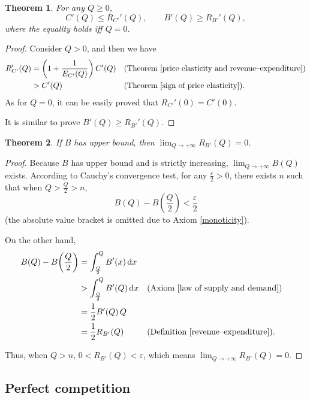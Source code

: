 \documentclass{article}
\newtheorem{theorem}{Theorem}[subsection]
\begin{document}
\begin{theorem}
\label{inequality of revenue--expenditure and supply and demand}
For any $Q\ge0$,
$$C'\!\left(Q\right)\le R_{C'}'\!\left(Q\right),
\qquad B'\!\left(Q\right)\ge R_{B'}'\!\left(Q\right),$$
where the equality holds iff $Q=0$.
\end{theorem}
\begin{proof}
Consider $Q>0$, and then we have
\begin{align*}
R_{C'}'\!\left(Q\right)&=\left(1+\frac1{E_{C'}\!\left(Q\right)}\right)C'\!\left(Q\right)&&\text{(Theorem \ref{price elasticity and revenue--expenditure})}\\
&>C'\!\left(Q\right)&&\text{(Theorem \ref{sign of price elasticity})}.
\end{align*}
As for $Q=0$, it can be easily proved that $R_{C'}'\!\left(0\right)=C'\!\left(0\right)$.

It is similar to prove $B'\!\left(Q\right)\ge R_{B'}'\!\left(Q\right)$.
\end{proof}

\begin{theorem}
\label{expenditure approaches 0}
If $B$ has upper bound, then $\lim_{Q\to+\infty}R_{B'}\!\left(Q\right)=0$.
\end{theorem}
\begin{proof}
Because $B$ has upper bound and is strictly increasing, $\lim_{Q\to+\infty}B\!\left(Q\right)$ exists.
According to Cauchy's convergence test, for any $\frac\varepsilon2>0$, there exists $n$ such that
when $Q>\frac Q2>n$,
$$B\!\left(Q\right)-B\!\left(\frac Q2\right)<\frac\varepsilon2$$
(the absolute value bracket is omitted due to Axiom \ref{monoticity}).

On the other hand,
\begin{align*}
B\!\left(Q\right)-B\!\left(\frac Q2\right)&=\int_{\frac Q2}^QB'\!\left(x\right)\mathrm dx\\
&>\int_{\frac Q2}^QB'\!\left(Q\right)\mathrm dx&&\text{(Axiom \ref{law of supply and demand})}\\
&=\frac12B'\!\left(Q\right)Q\\
&=\frac12R_{B'}\!\left(Q\right)&&\text{(Definition \ref{revenue--expenditure})}.
\end{align*}

Thus, when $Q>n$, $0<R_{B'}\!\left(Q\right)<\varepsilon$, which means $\lim_{Q\to+\infty}R_{B'}\!\left(Q\right)=0$.
\end{proof}

\subsection{Perfect competition}
\label{perfect competition}
\end{document}
